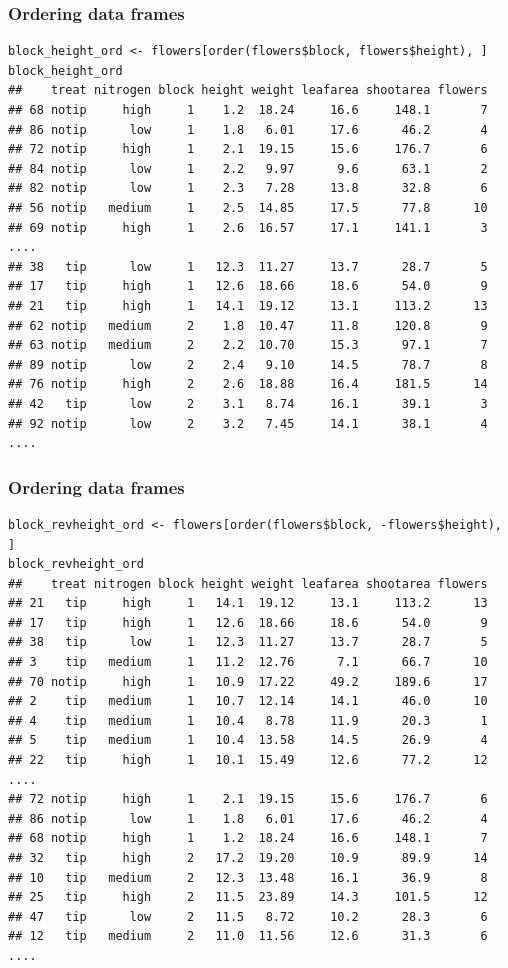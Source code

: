\documentclass{beamer}
\newcommand{\bfr}[1]{\begin{frame}[fragile]\frametitle{{ #1 }}}
\begin{document}
\bfr{Ordering data frames}
\scriptsize
\begin{verbatim}
block_height_ord <- flowers[order(flowers$block, flowers$height), ]        
block_height_ord
##    treat nitrogen block height weight leafarea shootarea flowers
## 68 notip     high     1    1.2  18.24     16.6     148.1       7
## 86 notip      low     1    1.8   6.01     17.6      46.2       4
## 72 notip     high     1    2.1  19.15     15.6     176.7       6
## 84 notip      low     1    2.2   9.97      9.6      63.1       2
## 82 notip      low     1    2.3   7.28     13.8      32.8       6
## 56 notip   medium     1    2.5  14.85     17.5      77.8      10
## 69 notip     high     1    2.6  16.57     17.1     141.1       3
....
## 38   tip      low     1   12.3  11.27     13.7      28.7       5
## 17   tip     high     1   12.6  18.66     18.6      54.0       9
## 21   tip     high     1   14.1  19.12     13.1     113.2      13
## 62 notip   medium     2    1.8  10.47     11.8     120.8       9
## 63 notip   medium     2    2.2  10.70     15.3      97.1       7
## 89 notip      low     2    2.4   9.10     14.5      78.7       8
## 76 notip     high     2    2.6  18.88     16.4     181.5      14
## 42   tip      low     2    3.1   8.74     16.1      39.1       3
## 92 notip      low     2    3.2   7.45     14.1      38.1       4
....
\end{verbatim}
\end{frame}




\bfr{Ordering data frames}
\scriptsize
\begin{verbatim}
block_revheight_ord <- flowers[order(flowers$block, -flowers$height), ]        
block_revheight_ord
##    treat nitrogen block height weight leafarea shootarea flowers
## 21   tip     high     1   14.1  19.12     13.1     113.2      13
## 17   tip     high     1   12.6  18.66     18.6      54.0       9
## 38   tip      low     1   12.3  11.27     13.7      28.7       5
## 3    tip   medium     1   11.2  12.76      7.1      66.7      10
## 70 notip     high     1   10.9  17.22     49.2     189.6      17
## 2    tip   medium     1   10.7  12.14     14.1      46.0      10
## 4    tip   medium     1   10.4   8.78     11.9      20.3       1
## 5    tip   medium     1   10.4  13.58     14.5      26.9       4
## 22   tip     high     1   10.1  15.49     12.6      77.2      12
....
## 72 notip     high     1    2.1  19.15     15.6     176.7       6
## 86 notip      low     1    1.8   6.01     17.6      46.2       4
## 68 notip     high     1    1.2  18.24     16.6     148.1       7
## 32   tip     high     2   17.2  19.20     10.9      89.9      14
## 10   tip   medium     2   12.3  13.48     16.1      36.9       8
## 25   tip     high     2   11.5  23.89     14.3     101.5      12
## 47   tip      low     2   11.5   8.72     10.2      28.3       6
## 12   tip   medium     2   11.0  11.56     12.6      31.3       6
....
\end{verbatim}
\end{frame}
\end{document}
